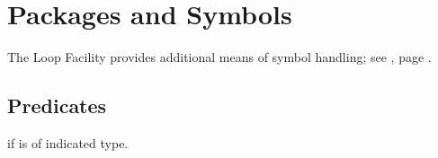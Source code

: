 %
%

\section{Packages and Symbols}
The Loop Facility provides additional means of symbol handling; see , page \pageref{section:Loop Facility}.

\subsection{Predicates}
\begin{LIST}{1cm}

  {
    \retval{\T} if  is of indicated type.
  }

\end{LIST}


